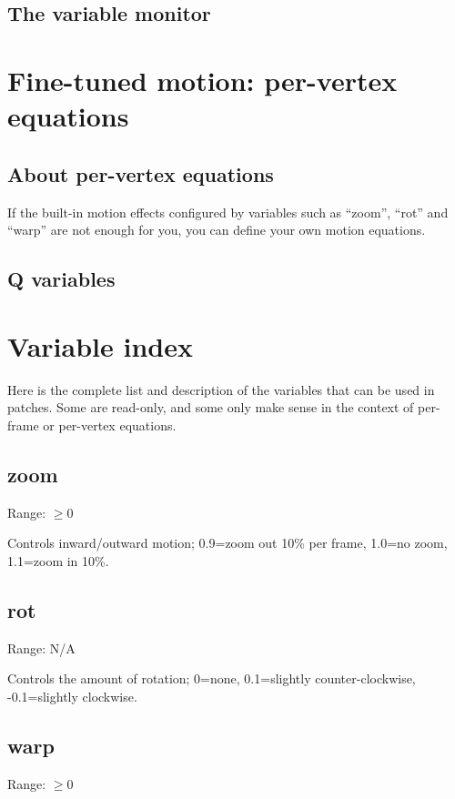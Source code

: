 \documentclass[11pt, a5paper, pagesize]{scrbook}
\begin{document}
\subsection{The variable monitor}

\section{Fine-tuned motion: per-vertex equations}

\subsection{About per-vertex equations}
If the built-in motion effects configured by variables such as ``zoom'', ``rot'' and ``warp'' are not enough for you, you can define your own motion equations.

\subsection{Q variables}


\section{Variable index}
Here is the complete list and description of the variables that can be used in patches. Some are read-only, and some only make sense in the context of per-frame or per-vertex equations.


\subsection{zoom}
Range: $\geq 0$

Controls inward/outward motion; 0.9=zoom out 10\% per frame, 1.0=no zoom, 1.1=zoom in 10\%.

\subsection{rot}
Range: N/A

Controls the amount of rotation; 0=none, 0.1=slightly counter-clockwise, -0.1=slightly clockwise.

\subsection{warp}
Range: $\geq 0$
\end{document}

